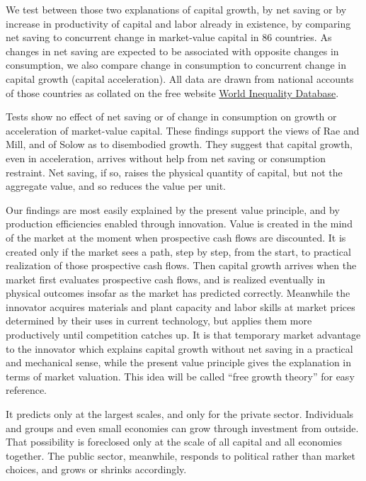 \documentclass[a4paper,fleqn]{latex_styles/cas-sc}
\begin{document}
We test between those two explanations of capital growth, by net
saving or by increase in productivity of capital and labor already
in existence, by comparing net saving to concurrent change in
market-value capital in 86 countries. As changes in net saving
are expected to be associated with opposite changes in consumption, we
also compare change in consumption to concurrent change in capital
growth (capital acceleration). All data are drawn from national accounts
of those countries as collated on the free website \href{https://wid.world/}{World Inequality Database}.

Tests show no effect of net saving or of change in consumption on
growth or acceleration of market-value capital. These findings support
the views of Rae and Mill, and of Solow as to disembodied growth. They
suggest that capital growth, even in acceleration, arrives without help
from net saving or consumption restraint. Net saving, if so,
raises the physical quantity of capital, but not the aggregate value,
and so reduces the value per unit.

Our findings are most easily explained by the present value principle,
and by production efficiencies enabled through innovation. Value is
created in the mind of the market at the moment when prospective cash
flows are discounted. It is created only if the market sees a path, step
by step, from the start, to practical realization of those prospective
cash flows. Then capital growth arrives when the market first evaluates
prospective cash flows, and is realized eventually in physical outcomes
insofar as the market has predicted correctly. Meanwhile the innovator
acquires materials and plant capacity and labor skills at market prices
determined by their uses in current technology, but applies them more
productively until competition catches up. It is that temporary market
advantage to the innovator which explains capital growth without net
saving in a practical and mechanical sense, while the present value
principle gives the explanation in terms of market valuation. This idea
will be called ``free growth theory'' for easy reference.

It predicts only at the largest scales, and only for the private sector.
Individuals and groups and even small economies can grow through
investment from outside. That possibility is foreclosed only at the
scale of all capital and all economies together. The public sector,
meanwhile, responds to political rather than market choices, and grows
or shrinks accordingly.
\end{document}
